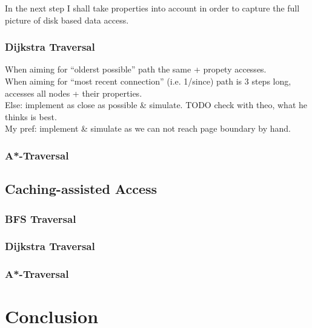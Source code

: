\documentclass[a4paper,10pt]{article}
\begin{document}
            In the next step I shall take properties into account in order to capture the full picture of disk based data access.
            
            
        \subsubsection{Dijkstra Traversal}
            When aiming for ``olderst possible'' path the same + propety accesses. \\
            When aiming for ``most recent connection'' (i.e. 1/since) path is 3 steps long, accesses all nodes + their properties. \\
            Else: implement as close as possible \& simulate.
            TODO check with theo, what he thinks is best. \\
            My pref: implement \& simulate as we can not reach page boundary by hand.
            
        \subsubsection{A*-Traversal}


    \subsection{Caching-assisted Access}
        \subsubsection{BFS Traversal}

        \subsubsection{Dijkstra Traversal}

        \subsubsection{A*-Traversal}


\section{Conclusion}

\nocite{*}
\printbibliography{}
\end{document}
